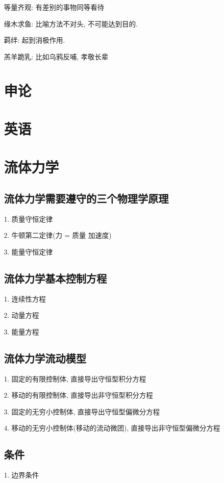\documentclass[UTF8]{ctexart}
\begin{document}
等量齐观: 有差别的事物同等看待

缘木求鱼: 比喻方法不对头, 不可能达到目的.

羁绊: 起到消极作用.

羔羊跪乳: 比如乌鸦反哺, 孝敬长辈

\section{申论}



\section{英语}



\section{流体力学}

\subsection{流体力学需要遵守的三个物理学原理}

1. 质量守恒定律

2. 牛顿第二定律(力 = 质量 \times 加速度)

3. 能量守恒定律

\subsection{流体力学基本控制方程}

1. 连续性方程

2. 动量方程

3. 能量方程

\subsection{流体力学流动模型}

1. 固定的有限控制体, 直接导出守恒型积分方程

2. 移动的有限控制体, 直接导出非守恒型积分方程

3. 固定的无穷小控制体, 直接导出守恒型偏微分方程

4. 移动的无穷小控制体(移动的流动微团), 直接导出非守恒型偏微分方程

\subsection{条件}
1. 边界条件
\end{document}
